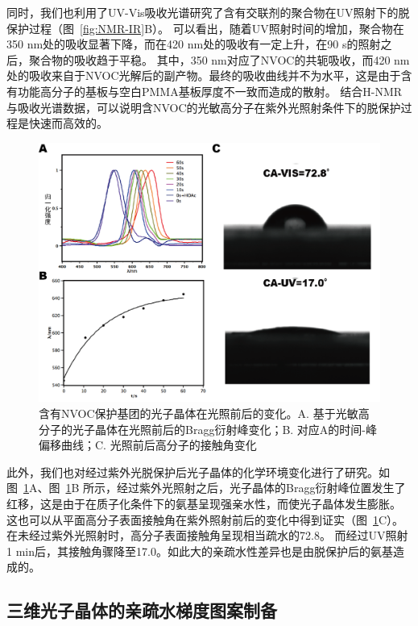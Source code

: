 同时，我们也利用了UV-Vis吸收光谱研究了含有交联剂的聚合物在UV照射下的脱保护过程（图~\ref{fig:NMR-IR}B）。
可以看出，随着UV照射时间的增加，聚合物在350 nm处的吸收显著下降，而在420 nm处的吸收有一定上升，在90 s的照射之后，聚合物的吸收趋于平稳。
其中，350 nm对应了NVOC的共轭吸收，而420 nm处的吸收来自于NVOC光解后的副产物。最终的吸收曲线并不为水平，这是由于含有功能高分子的基板与空白PMMA基板厚度不一致而造成的散射。
结合H-NMR与吸收光谱数据，可以说明含NVOC的光敏高分子在紫外光照射条件下的脱保护过程是快速而高效的。

\begin{figure}[htbp]
  \centering
  \includegraphics[width=0.85\linewidth]{figures/ch4/UV-Spectra.png}
  \caption{含有NVOC保护基团的光子晶体在光照前后的变化。A. 基于光敏高分子的光子晶体在光照前后的Bragg衍射峰变化；B. 对应A的时间-峰偏移曲线；C. 光照前后高分子的接触角变化}
  \label{fig:UV-spectra}
\end{figure}
此外，我们也对经过紫外光脱保护后光子晶体的化学环境变化进行了研究。如
	图~\ref{fig:UV-spectra}A、图~\ref{fig:UV-spectra}B
所示，经过紫外光照射之后，光子晶体的Bragg衍射峰位置发生了红移，这是由于在质子化条件下的氨基呈现强亲水性，而使光子晶体发生膨胀。
这也可以从平面高分子表面接触角在紫外照射前后的变化中得到证实（图~\ref{fig:UV-spectra}C）。
在未经过紫外光照射时，高分子表面接触角呈现相当疏水的72.8\text{$^\circ$}。
而经过UV照射1 min后，其接触角骤降至17.0\text{$^\circ$}。如此大的亲疏水性差异也是由脱保护后的氨基造成的。

\subsection{三维光子晶体的亲疏水梯度图案制备}

